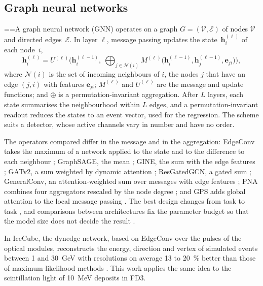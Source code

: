 \subsection{Graph neural networks}
\label{sec:rev_gnn}

{ \abovedisplayshortskip=\abovedisplayskip \belowdisplayshortskip=\belowdisplayskip A graph neural network (GNN) operates on a graph $G = (\mathcal{V}, \mathcal{E})$ of nodes $\mathcal{V}$ and directed edges~$\mathcal{E}$. In layer $\ell$, message passing \citep{gilmer2017neural} updates the state~$\mathbf{h}_i^{(\ell)}$ of each node~$i$,
\begin{equation}
  \mathbf{h}_i^{(\ell)} = U^{(\ell)}\Big(\mathbf{h}_i^{(\ell-1)},\ \bigoplus_{j \in \mathcal{N}(i)} M^{(\ell)}\big(\mathbf{h}_i^{(\ell-1)}, \mathbf{h}_j^{(\ell-1)}, \mathbf{e}_{ji}\big)\Big),
  \label{eq:mensagens}
\end{equation}
where $\mathcal{N}(i)$ is the set of incoming neighbours of $i$, the nodes $j$ that have an edge $(j, i)$ with features $\mathbf{e}_{ji}$; $M^{(\ell)}$ and $U^{(\ell)}$ are the message and update functions; and $\oplus$ is a permutation-invariant aggregation. After $L$ layers, each state summarises the neighbourhood within $L$ edges, and a permutation-invariant readout reduces the states to an event vector, used for the regression. The scheme suits a detector, whose active channels vary in number and have no order.\par}

The operators compared differ in the message and in the aggregation: EdgeConv takes the maximum of a network applied to the state and to the difference to each neighbour \citep{wang2019dynamic}; GraphSAGE, the mean \citep{hamilton2017inductive}; GINE, the sum with the edge features \citep{hu2020strategies}; GATv2, a sum weighted by dynamic attention \citep{brody2022how}; ResGatedGCN, a gated sum \citep{bresson2017residual}; GeneralConv, an attention-weighted sum over messages with edge features \citep{you2020design}; PNA combines four aggregators rescaled by the node degree \citep{corso2020principal}; and GPS adds global attention to the local message passing \citep{rampasek2022recipe}. The best design changes from task to task \citep{you2020design}, and comparisons between architectures fix the parameter budget so that the model size does not decide the result \citep{dwivedi2023benchmarking}.

In IceCube, the dynedge network, based on EdgeConv over the pulses of the optical modules, reconstructs the energy, direction and vertex of simulated events between \num{1} and \qty{30}{\GeV} with resolutions on average \num{13} to \qty{20}{\percent} better than those of maximum-likelihood methods \citep{abbasi2022graph}. This work applies the same idea to the scintillation light of \qty{10}{\MeV} deposits in FD3.

